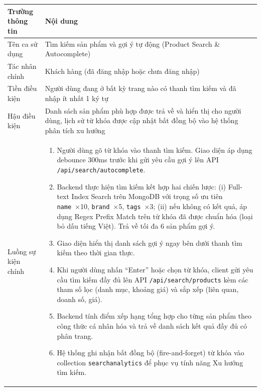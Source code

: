 \documentclass[../DoAn.tex]{subfiles}
\begin{document}
\renewcommand{\arraystretch}{1.4}
\label{table:ucB2_search}
\noindent\begin{tabular}{|>{\columncolor{blue!6}\raggedright\arraybackslash}p{3.5cm}|>{\raggedright\arraybackslash}p{10.5cm}|}
\hline
\rowcolor{blue!18}
\textbf{Trường thông tin} & \textbf{Nội dung} \\
\hline
Tên ca sử dụng & Tìm kiếm sản phẩm và gợi ý tự động (Product Search \& Autocomplete) \\
\hline
Tác nhân chính & Khách hàng (đã đăng nhập hoặc chưa đăng nhập) \\
\hline
Tiền điều kiện & Người dùng đang ở bất kỳ trang nào có thanh tìm kiếm và đã nhập ít nhất 1 ký tự \\
\hline
Hậu điều kiện & Danh sách sản phẩm phù hợp được trả về và hiển thị cho người dùng, lịch sử từ khóa được cập nhật bất đồng bộ vào hệ thống phân tích xu hướng \\
\hline
Luồng sự kiện chính &
\begin{minipage}[t]{10.3cm}
\vspace{3pt}
\raggedright
\begin{enumerate}[leftmargin=1.5em, topsep=0pt, parsep=0pt, itemsep=2pt, partopsep=0pt]
    \item Người dùng gõ từ khóa vào thanh tìm kiếm. Giao diện áp dụng debounce 300ms trước khi gửi yêu cầu gợi ý lên API \texttt{/api/search/autocomplete}.
    \item Backend thực hiện tìm kiếm kết hợp hai chiến lược: (i) Full-text Index Search trên MongoDB với trọng số ưu tiên \texttt{name}~×10, \texttt{brand}~×5, \texttt{tags}~×3; (ii) nếu không có kết quả, áp dụng Regex Prefix Match trên từ khóa đã được chuẩn hóa (loại bỏ dấu tiếng Việt). Trả về tối đa 6 sản phẩm gợi ý.
    \item Giao diện hiển thị danh sách gợi ý ngay bên dưới thanh tìm kiếm theo thời gian thực.
    \item Khi người dùng nhấn ``Enter'' hoặc chọn từ khóa, client gửi yêu cầu tìm kiếm đầy đủ lên API \texttt{/api/search/products} kèm các tham số lọc (danh mục, khoảng giá) và sắp xếp (liên quan, doanh số, giá).
    \item Backend tính điểm xếp hạng tổng hợp cho từng sản phẩm theo công thức cá nhân hóa và trả về danh sách kết quả đầy đủ có phân trang.
    \item Hệ thống ghi nhận bất đồng bộ (fire-and-forget) từ khóa vào collection \texttt{searchanalytics} để phục vụ tính năng Xu hướng tìm kiếm.

\end{enumerate}
\end{minipage}
\end{tabular}
\end{document}
